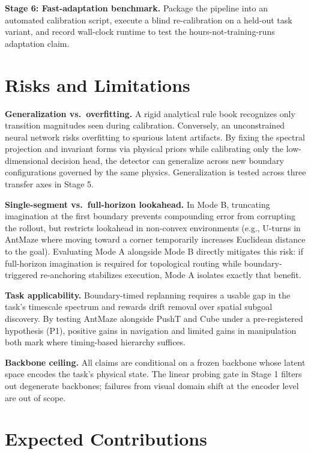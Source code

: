 \documentclass[11pt]{article}
\begin{document}
\textbf{Stage 6: Fast-adaptation benchmark.} Package the pipeline into an automated calibration script, execute a blind re-calibration on a held-out task variant, and record wall-clock runtime to test the hours-not-training-runs adaptation claim.

\section{Risks and Limitations}

\textbf{Generalization vs.\ overfitting.} A rigid analytical rule book recognizes only transition magnitudes seen during calibration. Conversely, an unconstrained neural network risks overfitting to spurious latent artifacts. By fixing the spectral projection and invariant forms via physical priors while calibrating only the low-dimensional decision head, the detector can generalize across new boundary configurations governed by the same physics. Generalization is tested across three transfer axes in Stage 5.

\textbf{Single-segment vs.\ full-horizon lookahead.} In Mode B, truncating imagination at the first boundary prevents compounding error from corrupting the rollout, but restricts lookahead in non-convex environments (e.g., U-turns in AntMaze where moving toward a corner temporarily increases Euclidean distance to the goal). Evaluating Mode A alongside Mode B directly mitigates this risk: if full-horizon imagination is required for topological routing while boundary-triggered re-anchoring stabilizes execution, Mode A isolates exactly that benefit.

\textbf{Task applicability.} Boundary-timed replanning requires a usable gap in the task's timescale spectrum and rewards drift removal over spatial subgoal discovery. By testing AntMaze alongside PushT and Cube under a pre-registered hypothesis (P1), positive gains in navigation and limited gains in manipulation both mark where timing-based hierarchy suffices.

\textbf{Backbone ceiling.} All claims are conditional on a frozen backbone whose latent space encodes the task's physical state. The linear probing gate in Stage 1 filters out degenerate backbones; failures from visual domain shift at the encoder level are out of scope.

\section{Expected Contributions}
\end{document}
